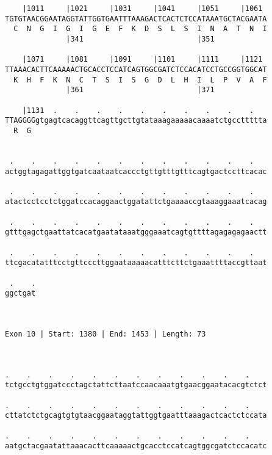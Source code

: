 \documentclass{article}
\begin{document}
\begin{Verbatim}
    |1011     |1021     |1031     |1041     |1051     |1061 
TGTGTAACGGAATAGGTATTGGTGAATTTAAAGACTCACTCTCCATAAATGCTACGAATA
  C  N  G  I  G  I  G  E  F  K  D  S  L  S  I  N  A  T  N  I
              |341                          |351            
  
    |1071     |1081     |1091     |1101     |1111     |1121 
TTAAACACTTCAAAAACTGCACCTCCATCAGTGGCGATCTCCACATCCTGCCGGTGGCAT
  K  H  F  K  N  C  T  S  I  S  G  D  L  H  I  L  P  V  A  F
              |361                          |371            
  
    |1131  .    .    .    .    .    .    .    .    .    .   
TTAGGGGgtgagtcacaggttcagttgcttgtataaagaaaaacaaaatctgccttttta
  R  G                                                      
                                                            
  
 .    .    .    .    .    .    .    .    .    .    .    .   
actggtagagattggtgatcaataatcaccctgttgtttgtttcagtgactccttcacac
                                                            
 .    .    .    .    .    .    .    .    .    .    .    .   
atactcctcctctggatccacaggaactggatattctgaaaaccgtaaaggaaatcacag
                                                            
 .    .    .    .    .    .    .    .    .    .    .    .   
gtttgagctgaattatcacatgaatataaatgggaaatcagtgttttagagagagaactt
                                                            
 .    .    .    .    .    .    .    .    .    .    .    .   
ttcgacatatttcctgttcccttggaataaaaacatttcttctgaaattttaccgttaat
                                                            
 .    .
ggctgat
       
       
 
Exon 10 | Start: 1380 | End: 1453 | Length: 73



.    .    .    .    .    .    .    .    .    .    .    .    
tctgcctgtggatccctagctattcttaatccaacaaatgtgaacggaatacacgtctct
                                                            
.    .    .    .    .    .    .    .    .    .    .    .    
cttatctctgcagtgtgtaacggaataggtattggtgaatttaaagactcactctccata
                                                            
.    .    .    .    .    .    .    .    .    .    .    .    
aatgctacgaatattaaacacttcaaaaactgcacctccatcagtggcgatctccacatc
                                                            

\end{Verbatim}
\end{document}
